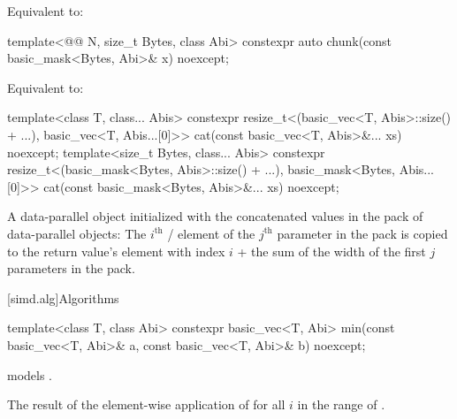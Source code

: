 \begin{itemdescr}
\pnum
\effects
Equivalent to: 
\end{itemdescr}

\begin{itemdecl}
template<@@ N, size_t Bytes, class Abi>
  constexpr auto chunk(const basic_mask<Bytes, Abi>& x) noexcept;
\end{itemdecl}

\begin{itemdescr}
\pnum
\effects
Equivalent to: 
\end{itemdescr}

\begin{itemdecl}
template<class T, class... Abis>
  constexpr resize_t<(basic_vec<T, Abis>::size() + ...),
    basic_vec<T, Abis...[0]>> cat(const basic_vec<T, Abis>&... xs) noexcept;
template<size_t Bytes, class... Abis>
  constexpr resize_t<(basic_mask<Bytes, Abis>::size() + ...),
    basic_mask<Bytes, Abis...[0]>> cat(const basic_mask<Bytes, Abis>&... xs) noexcept;
\end{itemdecl}

\begin{itemdescr}
\pnum
\returns
A data-parallel object initialized with the concatenated values in the
 pack of data-parallel objects: The $i^\text{th}$
/ element of the $j^\text{th}$
parameter in the  pack is copied to the return value's element with
index $i$ + the sum of the width of the first $j$ parameters in the 
pack.
\end{itemdescr}

[simd.alg]{Algorithms}

\begin{itemdecl}
template<class T, class Abi>
  constexpr basic_vec<T, Abi> min(const basic_vec<T, Abi>& a,
                                  const basic_vec<T, Abi>& b) noexcept;
\end{itemdecl}

\begin{itemdescr}
\pnum
\constraints
{} models .

\pnum
\returns
The result of the element-wise application of  for
all $i$ in the range of .
\end{itemdescr}

